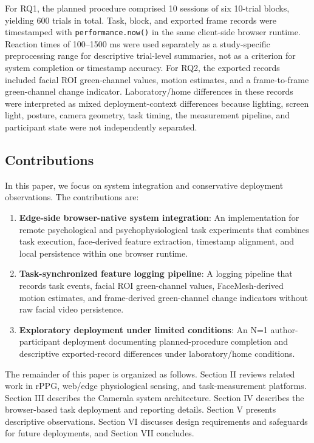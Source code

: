 \documentclass[dvipdfmx]{ehis}
\begin{document}
For RQ1, the planned procedure comprised 10 sessions of six 10-trial blocks, yielding 600 trials in total.
Task, block, and exported frame records were timestamped with \texttt{performance.now()} in the same client-side browser runtime.
Reaction times of 100--1500 ms were used separately as a study-specific preprocessing range for descriptive trial-level summaries, not as a criterion for system completion or timestamp accuracy.
For RQ2, the exported records included facial ROI green-channel values, motion estimates, and a frame-to-frame green-channel change indicator.
Laboratory/home differences in these records were interpreted as mixed deployment-context differences because lighting, screen light, posture, camera geometry, task timing, the measurement pipeline, and participant state were not independently separated.

\subsection{Contributions}
In this paper, we focus on system integration and conservative deployment observations. The contributions are:

\begin{enumerate}
    \item \textbf{Edge-side browser-native system integration}: An implementation for remote psychological and psychophysiological task experiments that combines task execution, face-derived feature extraction, timestamp alignment, and local persistence within one browser runtime.
    \item \textbf{Task-synchronized feature logging pipeline}: A logging pipeline that records task events, facial ROI green-channel values, FaceMesh-derived motion estimates, and frame-derived green-channel change indicators without raw facial video persistence.
    \item \textbf{Exploratory deployment under limited conditions}: An N=1 author-participant deployment documenting planned-procedure completion and descriptive exported-record differences under laboratory/home conditions.
\end{enumerate}

The remainder of this paper is organized as follows.
Section II reviews related work in rPPG, web/edge physiological sensing, and task-measurement platforms.
Section III describes the Camerala system architecture.
Section IV describes the browser-based task deployment and reporting details.
Section V presents descriptive observations.
Section VI discusses design requirements and safeguards for future deployments, and Section VII concludes.
\end{document}
